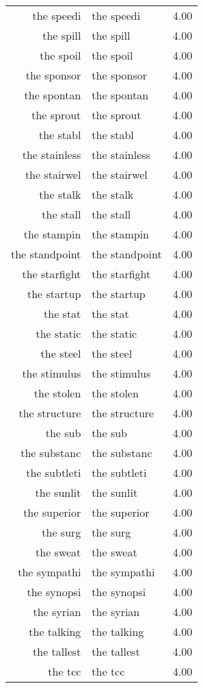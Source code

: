 \begin{table}[ht]
\begin{tabular}{rlr}
  the speedi & the speedi & 4.00 \\ 
  the spill & the spill & 4.00 \\ 
  the spoil & the spoil & 4.00 \\ 
  the sponsor & the sponsor & 4.00 \\ 
  the spontan & the spontan & 4.00 \\ 
  the sprout & the sprout & 4.00 \\ 
  the stabl & the stabl & 4.00 \\ 
  the stainless & the stainless & 4.00 \\ 
  the stairwel & the stairwel & 4.00 \\ 
  the stalk & the stalk & 4.00 \\ 
  the stall & the stall & 4.00 \\ 
  the stampin & the stampin & 4.00 \\ 
  the standpoint & the standpoint & 4.00 \\ 
  the starfight & the starfight & 4.00 \\ 
  the startup & the startup & 4.00 \\ 
  the stat & the stat & 4.00 \\ 
  the static & the static & 4.00 \\ 
  the steel & the steel & 4.00 \\ 
  the stimulus & the stimulus & 4.00 \\ 
  the stolen & the stolen & 4.00 \\ 
  the structure & the structure & 4.00 \\ 
  the sub & the sub & 4.00 \\ 
  the substanc & the substanc & 4.00 \\ 
  the subtleti & the subtleti & 4.00 \\ 
  the sunlit & the sunlit & 4.00 \\ 
  the superior & the superior & 4.00 \\ 
  the surg & the surg & 4.00 \\ 
  the sweat & the sweat & 4.00 \\ 
  the sympathi & the sympathi & 4.00 \\ 
  the synopsi & the synopsi & 4.00 \\ 
  the syrian & the syrian & 4.00 \\ 
  the talking & the talking & 4.00 \\ 
  the tallest & the tallest & 4.00 \\ 
  the tcc & the tcc & 4.00 \\ 

\end{tabular}
\end{table}
